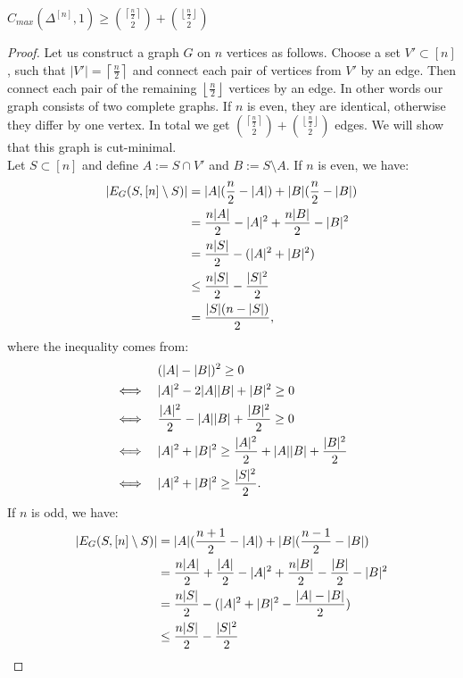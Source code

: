 \begin{prop}\label{proposition3}
\(C_{max}(\Delta^{[n]},1)\geq\binom{\left\lceil\frac{n}{2}\right\rceil}{2}+\binom{\left\lfloor\frac{n}{2}\right\rfloor}{2}\)
\begin{proof}
Let us construct a graph \(G\) on \(n\) vertices as follows. Choose a set \(V'\subset [n]\), such that \(|V'|=\left\lceil\frac{n}{2}\right\rceil\) and connect each pair of vertices from \(V'\) by an edge. Then connect each pair of the remaining \(\left\lfloor\frac{n}{2}\right\rfloor\) vertices by an edge. In other words our graph consists of two complete graphs. If \(n\) is even, they are identical, otherwise they differ by one vertex. In total we get \(\binom{\left\lceil\frac{n}{2}\right\rceil}{2}+\binom{\left\lfloor\frac{n}{2}\right\rfloor}{2}\) edges. We will show that this graph is cut-minimal.\\
Let \(S\subset [n]\) and define \(A:=S\cap V'\) and \(B:=S\setminus A\). If \(n\) is even, we have:
\begin{align}
|E_G(S,[n]\setminus S)|&=|A|(\frac{n}{2}-|A|)+|B|(\frac{n}{2}-|B|)\notag\\
&=\frac{n|A|}{2}-|A|^2+\frac{n|B|}{2}-|B|^2\notag\\
&=\frac{n|S|}{2}-(|A|^2+|B|^2)\notag\\
&\leq\frac{n|S|}{2}-\frac{|S|^2}{2}\notag\\
&=\frac{|S|(n-|S|)}{2},\notag
\end{align}
where the inequality comes from:
\begin{align}
&\quad\quad\quad\:\, (|A|-|B|)^2\geq 0\notag\\
&\Longleftrightarrow\quad |A|^2-2|A||B|+|B|^2\geq 0\notag\\
&\Longleftrightarrow\quad \frac{|A|^2}{2}-|A||B|+\frac{|B|^2}{2}\geq 0\notag\\
&\Longleftrightarrow\quad |A|^2+|B|^2\geq\frac{|A|^2}{2}+|A||B|+\frac{|B|^2}{2}\notag\\
&\Longleftrightarrow\quad |A|^2+|B|^2\geq\frac{|S|^2}{2}.\notag
\end{align}
If \(n\) is odd, we have:
\begin{align}
|E_G(S,[n]\setminus S)|&=|A|(\frac{n+1}{2}-|A|)+|B|(\frac{n-1}{2}-|B|)\notag\\
&=\frac{n|A|}{2}+\frac{|A|}{2}-|A|^2+\frac{n|B|}{2}-\frac{|B|}{2}-|B|^2\notag\\
&=\frac{n|S|}{2}-(|A|^2+|B|^2-\frac{|A|-|B|}{2})\notag\\
&\leq\frac{n|S|}{2}-\frac{|S|^2}{2}\notag\\

\end{align}
\end{proof}
\end{prop}
